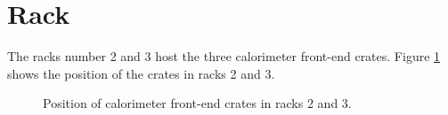 
\clearpage
\section{Rack}

The racks number 2 and 3 host the three calorimeter front-end crates.
Figure \ref{fig:calosignal:racks:0} shows the position of the crates in racks 2 and 3.

\begin{figure}[h!]
  \begin{center}
    \scalebox{1}{}
  \end{center}
  \caption{Position of calorimeter front-end crates in racks 2 and 3.}
  \label{fig:calosignal:racks:0}
\end{figure}

